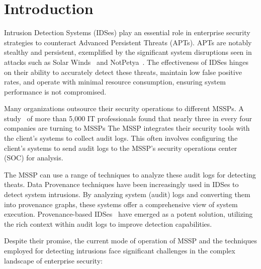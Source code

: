 \section{Introduction}
\label{s:intro}

Intrusion Detection Systems (IDSes) play an essential role in enterprise security strategies to counteract Advanced Persistent Threats (APTs). APTs are notably stealthy and persistent, exemplified by the significant system disruptions seen in attacks such as Solar Winds~\cite{solarwinds} and NotPetya~\cite{notpetya}. The effectiveness of IDSes hinges on their ability to accurately detect these threats, maintain low false positive rates, and operate with minimal resource consumption, ensuring system performance is not compromised.


Many organizations outsource their security operations to different MSSPs. A study~\cite{msspsurvey}  of more than 5,000 IT professionals found that nearly three in every four companies are turning to MSSPs The MSSP integrates their security tools with the client's systems to collect audit logs. This often involves configuring the client’s systems to send audit logs to the MSSP's security operations center (SOC) for analysis. 

The MSSP can use a range of techniques to analyze these audit logs for detecting theats. Data Provenance techniques have been increasingly used in IDSes to detect system intrusions. By analyzing system (audit) logs and converting them into provenance graphs, these systems offer a comprehensive view of system execution. Provenance-based IDSes~\cite{streamspot,provdetector2020,wang2022threatrace,shadewatcher,yangprographer,han2020unicorn} have emerged as a potent solution, utilizing the rich context within audit logs to improve detection capabilities.

Despite their promise, the current mode of operation of MSSP and the techniques employed for detecting intrusions face significant challenges in the complex landscape of enterprise security:

